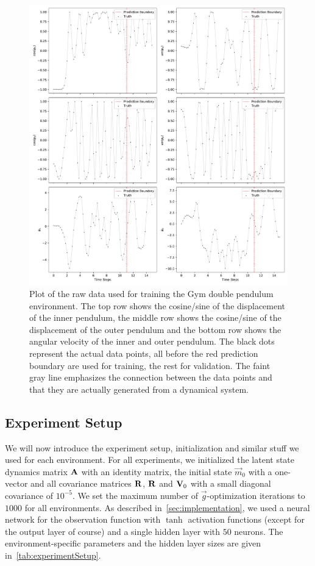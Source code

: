			\begin{figure}
				\centering
				\includegraphics[width=\linewidth]{figures/experiments/environments/observations-acrobot-gym-N0.pdf}
				\caption{Plot of the raw data used for training the Gym double pendulum environment. The top row shows the cosine/sine of the displacement of the inner pendulum, the middle row shows the cosine/sine of the displacement of the outer pendulum and the bottom row shows the angular velocity of the inner and outer pendulum. The black dots represent the actual data points, all before the red prediction boundary are used for training, the rest for validation. The faint gray line emphasizes the connection between the data points and that they are actually generated from a dynamical system.}
				\label{fig:envDoublePendulumGym}
			\end{figure}

	\subsection{Experiment Setup}
		We will now introduce the experiment setup, initialization and similar stuff we used for each environment. For all experiments, we initialized the latent state dynamics matrix \( \boldsymbol{\mathrm{A}} \) with an identity matrix, the initial state \( \vec{m}_0 \) with a one-vector and all covariance matrices \( \boldsymbol{\mathrm{R}} \), \( \boldsymbol{\mathrm{R}} \) and \( \boldsymbol{\mathrm{V}}_0 \) with a small diagonal covariance of \( 10^{-5} \). We set the maximum number of \(\vec{g}\)-optimization iterations to \(1000\) for all environments. As described in~\autoref{sec:implementation}, we used a neural network for the observation function with \(\tanh\) activation functions (except for the output layer of course) and a single hidden layer with \(50\) neurons. The environment-specific parameters and the hidden layer sizes are given in~\autoref{tab:experimentSetup}.

